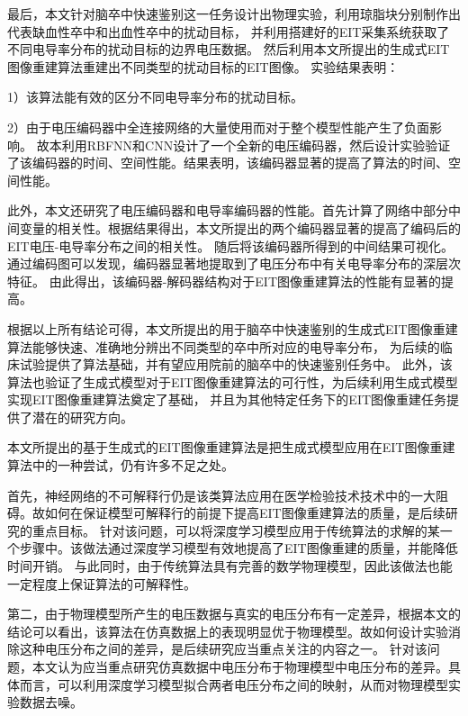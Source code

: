 最后，本文针对脑卒中快速鉴别这一任务设计出物理实验，利用琼脂块分别制作出代表缺血性卒中和出血性卒中的扰动目标，
并利用搭建好的EIT采集系统获取了不同电导率分布的扰动目标的边界电压数据。
然后利用本文所提出的生成式EIT图像重建算法重建出不同类型的扰动目标的EIT图像。
实验结果表明：

1）该算法能有效的区分不同电导率分布的扰动目标。
 
2）由于电压编码器中全连接网络的大量使用而对于整个模型性能产生了负面影响。
故本利用RBFNN和CNN设计了一个全新的电压编码器，然后设计实验验证了该编码器的时间、空间性能。结果表明，该编码器显著的提高了算法的时间、空间性能。

此外，本文还研究了电压编码器和电导率编码器的性能。首先计算了网络中部分中间变量的相关性。根据结果得出，本文所提出的两个编码器显著的提高了编码后的EIT电压-电导率分布之间的相关性。
随后将该编码器所得到的中间结果可视化。通过编码图可以发现，编码器显著地提取到了电压分布中有关电导率分布的深层次特征。
由此得出，该编码器-解码器结构对于EIT图像重建算法的性能有显著的提高。

根据以上所有结论可得，本文所提出的用于脑卒中快速鉴别的生成式EIT图像重建算法能够快速、准确地分辨出不同类型的卒中所对应的电导率分布，
为后续的临床试验提供了算法基础，并有望应用院前的脑卒中的快速鉴别任务中。
此外，该算法也验证了生成式模型对于EIT图像重建算法的可行性，为后续利用生成式模型实现EIT图像重建算法奠定了基础，
并且为其他特定任务下的EIT图像重建任务提供了潜在的研究方向。
 
 
本文所提出的基于生成式的EIT图像重建算法是把生成式模型应用在EIT图像重建算法中的一种尝试，仍有许多不足之处。
 
首先，神经网络的不可解释行仍是该类算法应用在医学检验技术技术中的一大阻碍。故如何在保证模型可解释行的前提下提高EIT图像重建算法的质量，是后续研究的重点目标。
针对该问题，可以将深度学习模型应用于传统算法的求解的某一个步骤中。该做法通过深度学习模型有效地提高了EIT图像重建的质量，并能降低时间开销。
与此同时，由于传统算法具有完善的数学物理模型，因此该做法也能一定程度上保证算法的可解释性。
 
第二，由于物理模型所产生的电压数据与真实的电压分布有一定差异，根据本文的结论可以看出，该算法在仿真数据上的表现明显优于物理模型。故如何设计实验消除这种电压分布之间的差异，是后续研究应当重点关注的内容之一。
针对该问题，本文认为应当重点研究仿真数据中电压分布于物理模型中电压分布的差异。具体而言，可以利用深度学习模型拟合两者电压分布之间的映射，从而对物理模型实验数据去噪。